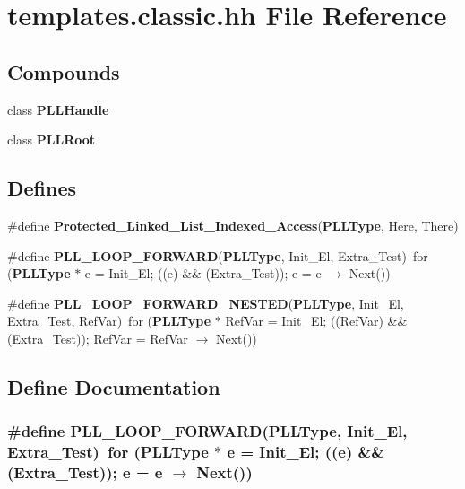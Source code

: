 \section{templates.classic.hh File Reference}
\label{templates_8classic_8hh}
\subsection*{Compounds}
\begin{CompactItemize}
\item 
class {\bf PLLHandle}
\item 
class {\bf PLLRoot}
\end{CompactItemize}
\subsection*{Defines}
\begin{CompactItemize}
\item 
\#define {\bf Protected\_\-Linked\_\-List\_\-Indexed\_\-Access}({\bf PLLType}, Here, There)
\item 
\#define {\bf PLL\_\-LOOP\_\-FORWARD}({\bf PLLType}, Init\_\-El, Extra\_\-Test)\ for ({\bf PLLType} $\ast$ e = Init\_\-El; ((e) \&\& (Extra\_\-Test)); e = e $\rightarrow$ Next())
\item 
\#define {\bf PLL\_\-LOOP\_\-FORWARD\_\-NESTED}({\bf PLLType}, Init\_\-El, Extra\_\-Test, Ref\-Var)\ for ({\bf PLLType} $\ast$ Ref\-Var = Init\_\-El; ((Ref\-Var) \&\& (Extra\_\-Test)); Ref\-Var = Ref\-Var $\rightarrow$ Next())
\end{CompactItemize}


\subsection{Define Documentation}
\subsubsection{\setlength{\rightskip}{0pt plus 5cm}\#define PLL\_\-LOOP\_\-FORWARD({\bf PLLType}, Init\_\-El, Extra\_\-Test)\ for ({\bf PLLType} $\ast$ e = Init\_\-El; ((e) \&\& (Extra\_\-Test)); e = e $\rightarrow$ Next())}\label{templates_8classic_8hh_a1}




